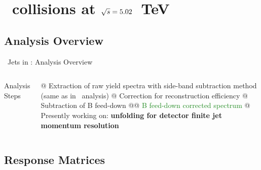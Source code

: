 \documentclass[xcolor={usenames,dvipsnames}, aspectratio=169]{beamer}
\begin{document}
\section{\pPb\ collisions at $\sqrt{s}=5.02$~TeV}

\subsection{Analysis Overview}

\begin{frame}[fragile]{\Dzero\ Jets in \pPb: Analysis Overview}
\begin{columns}
Analysis Steps
\vspace{5pt}
\small
\begin{easylist}[itemize]
@ Extraction of raw yield spectra with side-band subtraction method (same as in \pp\ analysis)
@ \textcolor{BrickRed}{Correction for reconstruction efficiency}
@ Subtraction of \textcolor{NavyBlue}{B feed-down}
@@ \textcolor{ForestGreen}{B feed-down corrected spectrum}
@ Presently working on: \textbf{unfolding for detector finite jet momentum resolution}
\end{easylist}
\end{columns}
\end{frame}

\subsection{Response Matrices}
\end{document}
